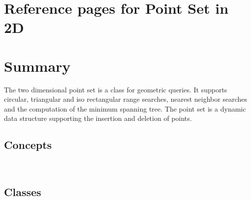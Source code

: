 

\ccParDims

\clearpage
\section{Reference pages for Point Set in 2D}

\section*{Summary}

The two dimensional point set is a class for geometric queries.
It supports circular, triangular and iso rectangular range searches,
nearest neighbor searches and the computation of the minimum spanning tree.
The point set is a dynamic data structure supporting the insertion and
deletion of points.

\subsection*{Concepts}
\\

\subsection*{Classes}
\\
\\
\\
\\
